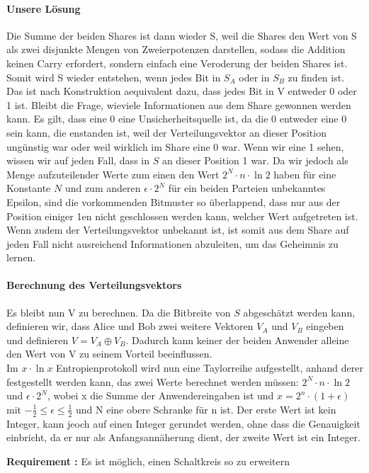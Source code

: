 \documentclass{article}
\newcounter{requirementscount}{}
\newcommand{\requirement}[1] {
        \addtocounter{requirementscount}{1}
        {\bf Requirement \therequirementscount:} #1\\
    }
\begin{document}
\paragraph{Unsere L\"osung}
Die Summe der beiden Shares ist dann wieder S, weil die Shares den Wert von
S als zwei disjunkte Mengen von Zweierpotenzen darstellen, sodass die Addition
keinen Carry erfordert, sondern einfach eine Veroderung der beiden Shares ist.
Somit wird S wieder entstehen, wenn jedes Bit in \(S_A\) oder in \(S_B\) zu
finden ist. Das ist nach Konstruktion aequivalent dazu, dass jedes Bit in V
entweder 0 oder 1 ist. Bleibt die Frage, wieviele Informationen aus dem Share
gewonnen werden kann. Es gilt, dass eine 0 eine Unsicherheitsquelle ist, da
die 0 entweder eine 0 sein kann, die enstanden ist, weil der Verteilungsvektor
an dieser Position ung\"unstig war oder weil wirklich im Share eine 0 war.
Wenn wir eine 1 sehen, wissen wir auf jeden Fall, dass in \(S\) an dieser
Position 1 war. Da wir jedoch als Menge aufzuteilender Werte zum einen den
Wert \(2^N \cdot n \cdot \ln 2\) haben f\"ur eine Konstante \(N\) und zum
anderen \(\epsilon \cdot 2^N\) f\"ur ein beiden Parteien unbekanntes
Epsilon, sind die vorkommenden Bitmuster so \"uberlappend, dass nur aus der
Position einiger 1en nicht geschlossen werden kann, welcher Wert aufgetreten 
ist. Wenn zudem der Verteilungsvektor unbekannt ist, ist somit aus dem Share
auf jeden Fall nicht ausreichend Informationen abzuleiten, um das Geheimnis
zu lernen.

\paragraph{Berechnung des Verteilungsvektors}
Es bleibt nun V zu berechnen. Da die Bitbreite von \(S\) abgesch\"atzt werden
kann, definieren wir, dass Alice und Bob zwei weitere Vektoren \(V_A\) und
\(V_B\) eingeben und definieren \(V = V_A \oplus V_B\). Dadurch kann keiner
der beiden Anwender alleine den Wert von V zu seinem Vorteil beeinflussen.\\
Im \(x \cdot \ln x\) Entropienprotokoll wird nun eine Taylorreihe aufgestellt,
anhand derer festgestellt werden kann, das zwei Werte berechnet werden m\"ussen:
\(2^N \cdot n \cdot \ln 2\) und \(\epsilon \cdot 2^N\), wobei x die
Summe der Anwendereingaben ist und \(x = 2^n\cdot(1+\epsilon)\) mit 
\(-\frac{1}{2} \leq \epsilon \leq \frac{1}{2}\) und N eine obere Schranke
f\"ur n ist. Der erste Wert ist kein Integer, kann jeoch auf einen Integer
gerundet werden, ohne dass die Genauigkeit einbricht, da er nur als
Anfangsann\"aherung dient, der zweite Wert ist ein Integer.
\requirement{Es ist m\"oglich, einen Schaltkreis so zu erweitern}
\end{document}
